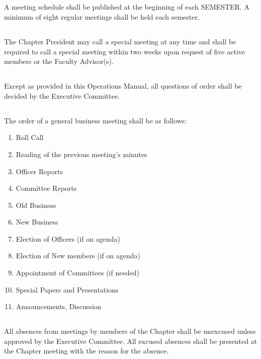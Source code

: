 \documentclass[10pt, oneside]{article}
\begin{document}
\subsection{}
A meeting schedule shall be published at the beginning of each SEMESTER. A minimum of eight regular meetings shall be held each semester.

\subsection{}
The Chapter President may call a special meeting at any time and shall be required to call a special meeting within two weeks upon request of five active members or the Faculty Advisor(s).

\subsection{}
Except as provided in this Operations Manual, all questions of order shall be decided by the Executive Committee.

\subsection{}
The order of a general business meeting shall be as follows:
\begin{enumerate}[label=\alph*.]
\item Roll Call
\item Reading of the previous meeting’s minutes
\item Officer Reports
\item Committee Reports
\item Old Business
\item New Business
\item Election of Officers (if on agenda)
\item Election of New members (if on agenda)
\item Appointment of Committees (if needed)
\item Special Papers and Presentations
\item Announcements, Discussion
\end{enumerate}

\subsection{}
All absences from meetings by members of the Chapter shall be unexcused unless approved by the Executive Committee. All excused absences shall be presented at the Chapter meeting with the reason for the absence.
\end{document}
